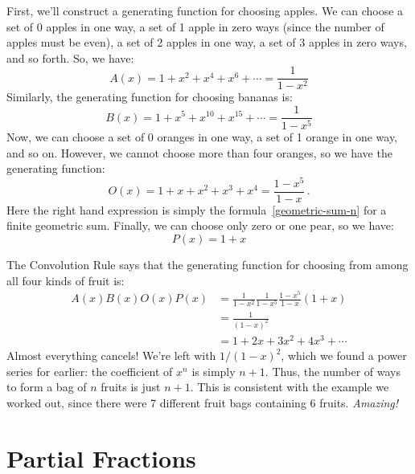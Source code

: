 First, we'll construct a generating function for choosing apples.  We
can choose a set of 0 apples in one way, a set of 1 apple in zero
ways (since the number of apples must be even), a set of 2 apples in
one way, a set of 3 apples in zero ways, and so forth.  So, we have:
%
\[
A(x) = 1 + x^2 + x^4 + x^6 + \cdots = \frac{1}{1 - x^2}
\]
%
Similarly, the generating function for choosing bananas is:
%
\[
B(x) = 1 + x^5 + x^{10} + x^{15} + \cdots = \frac{1}{1 - x^5}
\]
Now, we can choose a set of 0 oranges in one way, a set of 1 orange in
one way, and so on.  However, we cannot choose more than four
oranges, so we have the generating function:
%
\[
O(x) = 1 + x + x^2 + x^3 + x^4 = \frac{1-x^5}{1-x}\, .
\]
Here the right hand expression is simply the
formula~\eqref{geometric-sum-n} for a finite geometric sum.  Finally,
we can choose only zero or one pear, so we have:
%
\[
P(x) = 1 + x
\]

The Convolution Rule says that the generating function for choosing
from among all four kinds of fruit is:
%
\begin{align*}
A(x) B(x) O(x) P(x)
    & = \frac{1}{1-x^2} \frac{1}{1-x^5} \frac{1-x^5}{1-x} (1 + x) \\
    & = \frac{1}{(1-x)^2} \\
    & = 1 + 2x + 3x^2 + 4 x^3 + \cdots
\end{align*}
%
Almost everything cancels!  We're left with $1 / (1-x)^2$, which we
found a power series for earlier: the coefficient of $x^n$ is simply
$n+1$.  Thus, the number of ways to form a bag of $n$ fruits is just
$n+1$.  This is consistent with the example we worked out, since there
were 7 different fruit bags containing 6 fruits.  \textit{Amazing!}

\begin{problems}
\practiceproblems
{}

\classproblems
{}

\homeworkproblems
{}

\end{problems}


\section{Partial Fractions}\label{sec:partial-fraction}

